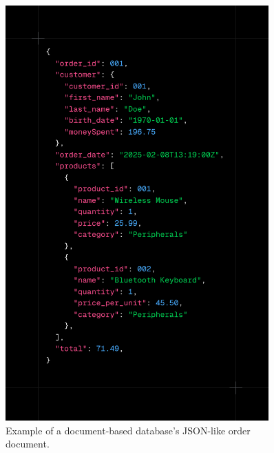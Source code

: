 \begin{figure}[htbp]
	\centering
	\includegraphics[width=0.9\textwidth, height=0.5\textheight, keepaspectratio]{Chapters/Figures/Databases/NoSQL.png}
	\caption{Example of a document-based database's JSON-like order document.}
	\label{fig:databases:NoSQL}
\end{figure}

